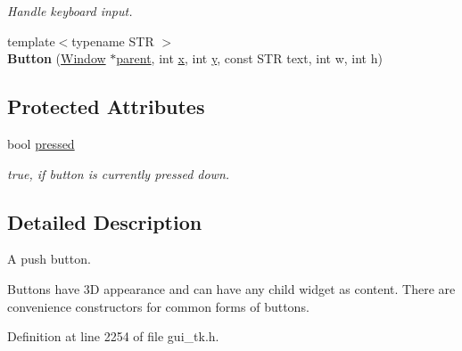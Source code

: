 \begin{DoxyCompactItemize}
\begin{DoxyCompactList}\small\item\em Handle keyboard input. \end{DoxyCompactList}\item 
\hypertarget{classGUI_1_1Button_ada8368b22e9bfcfa7ba9199f9ea3f7cc}{{\footnotesize template$<$typename S\-T\-R $>$ }\\{\bfseries Button} (\hyperlink{classGUI_1_1Window}{Window} $\ast$\hyperlink{classGUI_1_1Window_a2e593ff65e7702178d82fe9010a0b539}{parent}, int \hyperlink{classGUI_1_1Window_a6ca6a80ca00c9e1d8ceea8d3d99a657d}{x}, int \hyperlink{classGUI_1_1Window_a0ee8e923aff2c3661fc2e17656d37adf}{y}, const S\-T\-R text, int w, int h)}\label{classGUI_1_1Button_ada8368b22e9bfcfa7ba9199f9ea3f7cc}

\end{DoxyCompactItemize}
\subsection*{Protected Attributes}
\begin{DoxyCompactItemize}
\item 
\hypertarget{classGUI_1_1Button_aec37fa9a4a6ea6d1e0e2788d42d67ee1}{bool \hyperlink{classGUI_1_1Button_aec37fa9a4a6ea6d1e0e2788d42d67ee1}{pressed}}\label{classGUI_1_1Button_aec37fa9a4a6ea6d1e0e2788d42d67ee1}

\begin{DoxyCompactList}\small\item\em {\ttfamily true}, if button is currently pressed down. \end{DoxyCompactList}\end{DoxyCompactItemize}


\subsection{Detailed Description}
A push button. 

Buttons have 3\-D appearance and can have any child widget as content. There are convenience constructors for common forms of buttons. 

Definition at line 2254 of file gui\-\_\-tk.\-h.



